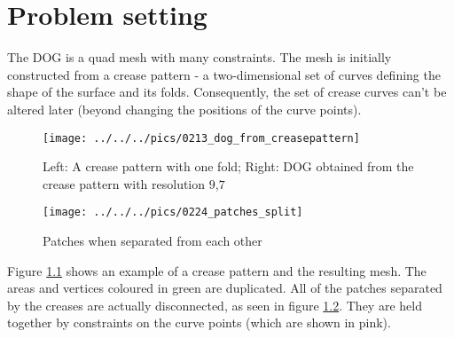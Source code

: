 \documentclass[a4paper,twoside,12pt,nochapterprefix]{scrbook}
\begin{document}
\chapter{Problem setting}\label{sec:problem}
The DOG is a quad mesh with many constraints. The mesh is initially constructed from a crease pattern - a two-dimensional set of curves defining the shape of the surface and its folds. Consequently, the set of crease curves can't be altered later (beyond changing the positions of the curve points).\newline
\begin{figure}
    \centering
    \setlength{\tabcolsep}{0.0130\linewidth}
    \texttt{[image: ../../../pics/0213\_dog\_from\_creasepattern]}
    \caption{Left: A crease pattern with one fold; Right: DOG obtained from the crease pattern with resolution $9$,$7$
      \label{fig:dog_from_creasepattern}}
\end{figure}
\begin{figure}
    \centering
    \setlength{\tabcolsep}{0.0130\linewidth}
    \texttt{[image: ../../../pics/0224\_patches\_split]}
    \caption{Patches when separated from each other
      \label{fig:patches_split}}
\end{figure}
Figure \ref{fig:dog_from_creasepattern} shows an example of a crease pattern and the resulting mesh. The areas and vertices coloured in green are duplicated. All of the patches separated by the creases are actually disconnected, as seen in figure \ref{fig:patches_split}. They are held together by constraints on the curve points (which are shown in pink).\newline
\end{document}
